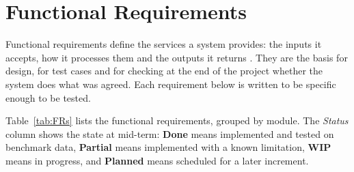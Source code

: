 \section{Functional Requirements}

Functional requirements define the services a system provides: the inputs it accepts, how it processes them and the outputs it returns \cite{sommerville2016se}. They are the basis for design, for test cases and for checking at the end of the project whether the system does what was agreed. Each requirement below is written to be specific enough to be tested.

Table~\ref{tab:FRs} lists the functional requirements, grouped by module. The \textit{Status} column shows the state at mid-term: \textbf{Done} means implemented and tested on benchmark data, \textbf{Partial} means implemented with a known limitation, \textbf{WIP} means in progress, and \textbf{Planned} means scheduled for a later increment.

